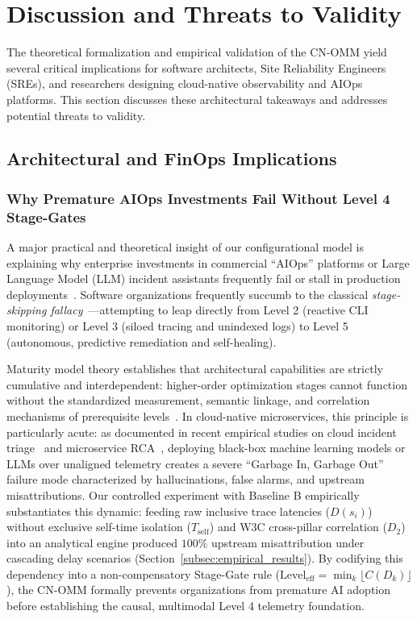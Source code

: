 \section{Discussion and Threats to Validity}
\label{sec:discussion}

The theoretical formalization and empirical validation of the CN-OMM yield several critical implications for software architects, Site Reliability Engineers (SREs), and researchers designing cloud-native observability and AIOps platforms. This section discusses these architectural takeaways and addresses potential threats to validity.

\subsection{Architectural and FinOps Implications}
\label{subsec:implications}

\subsubsection{Why Premature AIOps Investments Fail Without Level 4 Stage-Gates}
A major practical and theoretical insight of our configurational model is explaining why enterprise investments in commercial ``AIOps'' platforms or Large Language Model (LLM) incident assistants frequently fail or stall in production deployments~\cite{amgothu_2025, soldani_2022, roy_2024_fse}. Software organizations frequently succumb to the classical \textit{stage-skipping fallacy}~\cite{humphrey_1988, lasrado_2015, vansteenbergen_2010}---attempting to leap directly from Level 2 (reactive CLI monitoring) or Level 3 (siloed tracing and unindexed logs) to Level 5 (autonomous, predictive remediation and self-healing).

Maturity model theory establishes that architectural capabilities are strictly cumulative and interdependent: higher-order optimization stages cannot function without the standardized measurement, semantic linkage, and correlation mechanisms of prerequisite levels~\cite{humphrey_1988, lasrado_2015}. In cloud-native microservices, this principle is particularly acute: as documented in recent empirical studies on cloud incident triage~\cite{wang_2023_icse, roy_2024_fse} and microservice RCA~\cite{soldani_2022}, deploying black-box machine learning models or LLMs over unaligned telemetry creates a severe ``Garbage In, Garbage Out'' failure mode characterized by hallucinations, false alarms, and upstream misattributions. Our controlled experiment with Baseline B empirically substantiates this dynamic: feeding raw inclusive trace latencies ($D(s_i)$) without exclusive self-time isolation ($T_{\text{self}}$) and W3C cross-pillar correlation ($D_2$) into an analytical engine produced $100\%$ upstream misattribution under cascading delay scenarios (Section~\ref{subsec:empirical_results}). By codifying this dependency into a non-compensatory Stage-Gate rule ($\text{Level}_{\text{eff}} = \min_k \lfloor C(D_k) \rfloor$), the CN-OMM formally prevents organizations from premature AI adoption before establishing the causal, multimodal Level 4 telemetry foundation.

